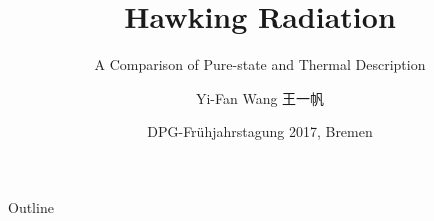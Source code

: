 \documentclass{beamer}
\title%
{Hawking Radiation}
\subtitle{A Comparison of Pure-state and Thermal Description}
\author[Wang] %
{Yi-Fan Wang 王一帆}
\institute[Uni zu Köln] %
{
  Institut für Theoretische Physik \\
  Universität zu Köln}
\date[Bremen17] %
{DPG-Frühjahrstagung 2017, Bremen}
\begin{document}
\begin{frame}
  \titlepage
\end{frame}

\begin{frame}{Outline}
  \tableofcontents
\end{frame}









\end{document}
